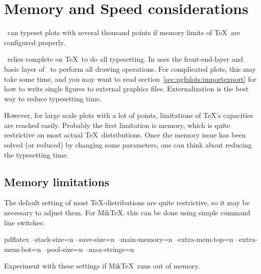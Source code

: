 \section{Memory and Speed considerations}
\label{sec:pgfplots:optimization}
\PGFPlots\ can typeset plots with several thousand points if memory limits of \TeX\ are configured properly.
\begin{codeexample}[]
\end{codeexample}
\PGFPlots\ relies complete on \TeX\ to do all typesetting. In uses the front-end-layer and basic layer of \PGF\ to perform all drawing operations. For complicated plots, this may take some time, and you may want to read section~\ref{sec:pgfplots:importexport} for how to write single figures to external graphics files. Externalization is the best way to reduce typesetting time.

However, for large scale plots with a lot of points, limitations of \TeX's capacities are reached easily. Probably the first limitation is memory, which is quite restrictive on most actual \TeX\ distributions. Once the memory issue has been solved (or reduced) by changing some parameters, one can think about reducing the typesetting time.

\subsection{Memory limitations}
The default setting of most \TeX-distributions are quite restrictive, so it may be necessary to adjust them. For Mik\TeX, this can be done using simple command line switches:
\begin{codeexample}
pdflatex 
	--stack-size=n --save-size=n 
	--main-memory=n --extra-mem-top=n --extra-mem-bot=n
	--pool-size=n --max-strings=n 
\end{codeexample}
\noindent Experiment with these settings if Mik\TeX\ runs out of memory. 

